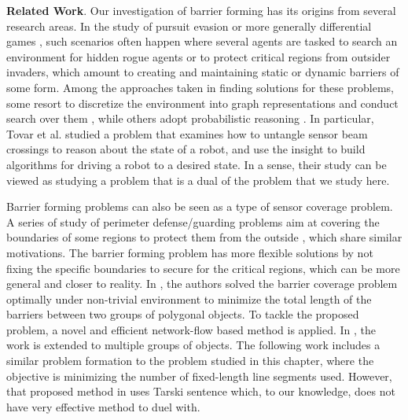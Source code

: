 \noindent\textbf{Related Work}.
Our investigation of barrier forming has its origins from several research areas.
In the study of pursuit evasion or more generally differential games \cite{ho1965differential,isaacs1999differential,hajek2008pursuit,tovar2009sensor,simov2000pursuit,guibas1997visibility,kameda2006online,kirousis1986searching, sachs2004visibility,lau2005optimal, yu2011shadow, olsen2022robust}, 
such scenarios often happen where several agents are tasked to search an environment for hidden rogue agents or to protect critical regions from outsider invaders, which amount to creating and maintaining static or dynamic barriers of some form.  
%
Among the approaches taken in finding solutions for these problems, some resort to discretize the environment into graph representations and conduct search over them \cite{kirousis1986searching, sachs2004visibility}, while others adopt probabilistic reasoning \cite{lau2005optimal, yu2011shadow}. 
%
In particular, Tovar et al. \cite{tovar2009sensor} studied a problem that examines how to untangle sensor beam crossings to reason about the state of a robot, and use the insight to build algorithms for driving a robot to a desired state. In a sense, their study can be viewed as studying a problem that is a dual of the problem that we study here. 


Barrier forming problems can also be seen as a type of sensor coverage problem. 
%
A series of study of perimeter defense/guarding problems aim at covering the boundaries of some regions to protect them from the outside \cite{shishika2020cooperative, macharet2020adaptive, fenghangaoyu2019efficient, fengyu2020optimally}, which share similar motivations. 
The barrier forming problem has more flexible solutions by not fixing the specific boundaries to secure for the critical regions,
which can be more general and closer to reality.
In \cite{kloder2007barrier}, the authors solved the barrier coverage problem optimally under non-trivial environment to minimize the total length of the barriers between two groups of polygonal objects. 
To tackle the proposed problem, a novel and efficient network-flow based method is applied. 
In \cite{abrahamsen2020geometric}, the work is extended to multiple groups of objects.
The following work \cite{kloder2008thesis} includes a similar problem formation to the problem studied in this chapter, where the objective is minimizing the number of fixed-length line segments used. 
%
However, that proposed method in \cite{kloder2008thesis} uses Tarski sentence \cite{tarski1949decision} which, to our knowledge, does not have very effective method to duel with.

